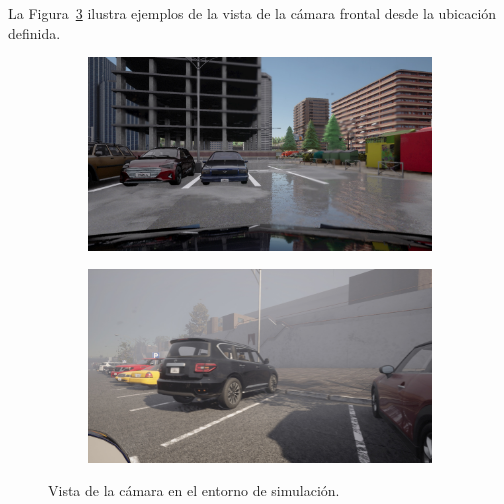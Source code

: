 \noindent
La Figura~\ref{fig:camera-view} ilustra ejemplos de la vista de la cámara frontal desde la ubicación definida.

\begin{figure}[!ht]
    \centering
    \begin{subfigure}{0.4\textwidth}
        \includegraphics[width=\textwidth]{img/mirrow_camara_ex}\label {fig:camara}
    \end{subfigure}
    \begin{subfigure}{0.4\textwidth}
        \includegraphics[width=\textwidth]{img/mirrow_camara_ex2}\label {fig:camara2}
    \end{subfigure}
    \caption{Vista de la cámara en el entorno de simulación.}
    \label{fig:camera-view}
\end{figure}




